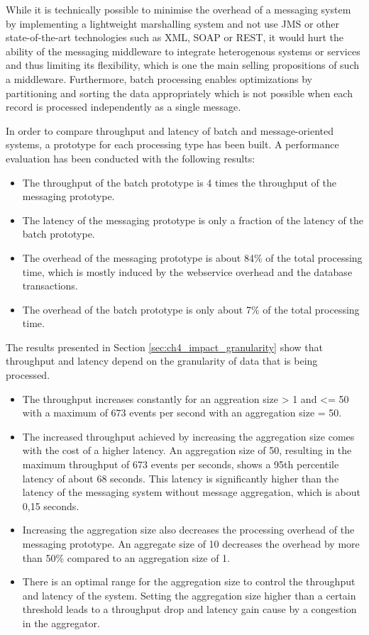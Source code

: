 While it is technically possible to minimise the overhead of a messaging system by implementing a lightweight marshalling system and not use JMS or other state-of-the-art technologies such as XML, SOAP or REST, it would hurt the ability of the messaging middleware to integrate heterogenous systems or services and thus limiting its flexibility, which is one the main selling propositions of such a middleware. Furthermore, batch processing enables optimizations by partitioning and sorting the data appropriately which is not possible when each record is processed independently as a single message.

In order to compare throughput and latency of batch and message-oriented systems, a prototype for each processing type has been built. A performance evaluation has been conducted with the following results:
\begin{itemize}
	\item The throughput of the batch prototype is 4 times the throughput of the messaging prototype.
	\item The latency of the messaging prototype is only a fraction of the latency of the batch prototype.
	\item The overhead of the messaging prototype is about 84\% of the total processing time, which is mostly induced by the webservice overhead and the database transactions. 
	\item The overhead of the batch prototype is only about 7\% of the total processing time.
\end{itemize}

The results presented in Section \ref{sec:ch4_impact_granularity} show that throughput and latency depend on the granularity of data that is being processed. 
\begin{itemize}
	\item The throughput increases constantly for an aggreation size > 1 and <= 50 with a maximum of 673 events per second with an aggregation size = 50.
	\item The increased throughput achieved by increasing the aggregation size comes with the cost of a higher latency. An aggregation size of 50, resulting in the maximum throughput of 673 events per seconds, shows a 95th percentile latency of about 68 seconds. This latency is significantly higher than the latency of the messaging system without message aggregation, which is about 0,15 seconds.
	\item Increasing the aggregation size also decreases the processing overhead of the messaging prototype. An aggregate size of 10 decreases the overhead by more than 50\% compared to an aggregation size of 1.
	\item There is an optimal range for the aggregation size to control the throughput and latency of the system. Setting the aggregation size higher than a certain threshold leads to a throughput drop and latency gain cause by a congestion in the aggregator.
\end{itemize}


